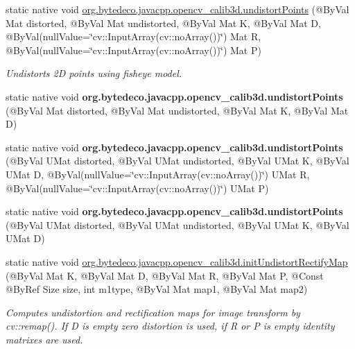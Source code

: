 \begin{DoxyCompactItemize}
\item 
static native void \hyperlink{group__calib3d__fisheye_ga76244e0842b37e17c2b00ef9a015b99a}{org.\+bytedeco.\+javacpp.\+opencv\+\_\+calib3d.\+undistort\+Points} (@By\+Val Mat distorted, @By\+Val Mat undistorted, @By\+Val Mat K, @By\+Val Mat D, @By\+Val(null\+Value=\char`\"{}cv\+::\+Input\+Array(cv\+::no\+Array())\char`\"{}) Mat R, @By\+Val(null\+Value=\char`\"{}cv\+::\+Input\+Array(cv\+::no\+Array())\char`\"{}) Mat P)
\begin{DoxyCompactList}\small\item\em Undistorts 2D points using fisheye model. \end{DoxyCompactList}\item 
\mbox{\label{group__calib3d__fisheye_gaf0a3429dfe018112cdfdfab474c29417}} 
static native void {\bfseries org.\+bytedeco.\+javacpp.\+opencv\+\_\+calib3d.\+undistort\+Points} (@By\+Val Mat distorted, @By\+Val Mat undistorted, @By\+Val Mat K, @By\+Val Mat D)
\item 
\mbox{\label{group__calib3d__fisheye_gaa1a38134348569ab45bfd63d795163df}} 
static native void {\bfseries org.\+bytedeco.\+javacpp.\+opencv\+\_\+calib3d.\+undistort\+Points} (@By\+Val U\+Mat distorted, @By\+Val U\+Mat undistorted, @By\+Val U\+Mat K, @By\+Val U\+Mat D, @By\+Val(null\+Value=\char`\"{}cv\+::\+Input\+Array(cv\+::no\+Array())\char`\"{}) U\+Mat R, @By\+Val(null\+Value=\char`\"{}cv\+::\+Input\+Array(cv\+::no\+Array())\char`\"{}) U\+Mat P)
\item 
\mbox{\label{group__calib3d__fisheye_ga8a787c4be1efcd0d4baf49bce7a99ee9}} 
static native void {\bfseries org.\+bytedeco.\+javacpp.\+opencv\+\_\+calib3d.\+undistort\+Points} (@By\+Val U\+Mat distorted, @By\+Val U\+Mat undistorted, @By\+Val U\+Mat K, @By\+Val U\+Mat D)
\item 
static native void \hyperlink{group__calib3d__fisheye_ga507f430243a293690d2c405dec6a0e82}{org.\+bytedeco.\+javacpp.\+opencv\+\_\+calib3d.\+init\+Undistort\+Rectify\+Map} (@By\+Val Mat K, @By\+Val Mat D, @By\+Val Mat R, @By\+Val Mat P, @Const @By\+Ref Size size, int m1type, @By\+Val Mat map1, @By\+Val Mat map2)
\begin{DoxyCompactList}\small\item\em Computes undistortion and rectification maps for image transform by cv\+::remap(). If D is empty zero distortion is used, if R or P is empty identity matrixes are used. \end{DoxyCompactList}\item 

\end{DoxyCompactItemize}

